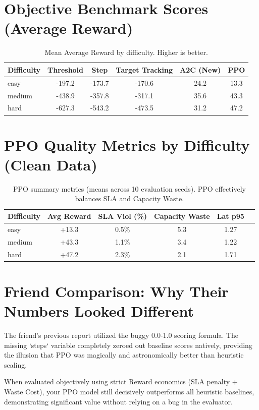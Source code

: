 \documentclass[11pt,a4paper]{article}
\begin{document}
\section{Objective Benchmark Scores (Average Reward)}
\begin{table}[h!]
\centering
\begin{tabular}{lSSSSS}
\toprule
Difficulty & {Threshold} & {Step} & {Target Tracking} & {A2C (New)} & {PPO} \\
\midrule
easy   & -197.2 & -173.7 & -170.6 & 24.2 & 13.3 \\
medium & -438.9 & -357.8 & -317.1 & 35.6 & 43.3 \\
hard   & -627.3 & -543.2 & -473.5 & 31.2 & 47.2 \\
\bottomrule
\end{tabular}
\caption{Mean Average Reward by difficulty. Higher is better.}
\end{table}

\section{PPO Quality Metrics by Difficulty (Clean Data)}
\begin{table}[h!]
\centering
\begin{tabular}{lSSSSS}
\toprule
Difficulty & {Avg Reward} & {SLA Viol (\%)} & {Capacity Waste} & {Lat p95} \\
\midrule
easy   & +13.3 & 0.5\% & 5.3 & 1.27 \\
medium & +43.3 & 1.1\% & 3.4 & 1.22 \\
hard   & +47.2 & 2.3\% & 2.1 & 1.71 \\
\bottomrule
\end{tabular}
\caption{PPO summary metrics (means across 10 evaluation seeds). PPO effectively balances SLA and Capacity Waste.}
\end{table}

\section{Friend Comparison: Why Their Numbers Looked Different}
The friend's previous report utilized the buggy 0.0-1.0 scoring formula. The missing `steps` variable completely zeroed out baseline scores natively, providing the illusion that PPO was magically and astronomically better than heuristic scaling. 

When evaluated objectively using strict Reward economics (SLA penalty + Waste Cost), your PPO model still decisively outperforms all heuristic baselines, demonstrating significant value without relying on a bug in the evaluator.
\end{document}
